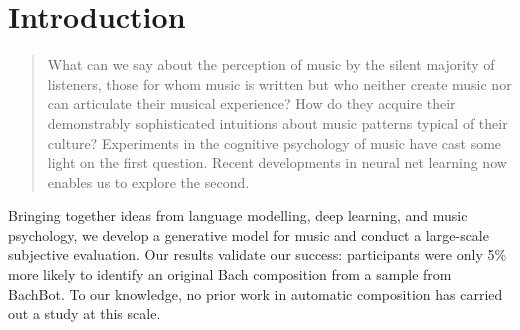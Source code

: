 


\chapter{Introduction}

\ifpdf
    \graphicspath{{Chapter1/Figs/Raster/}{Chapter1/Figs/PDF/}{Chapter1/Figs/}}
\else
    \graphicspath{{Chapter1/Figs/Vector/}{Chapter1/Figs/}}
\fi

\begin{quote}
  What can we say about the perception of music by the silent majority of
  listeners, those for whom music is written but who neither create music nor
  can articulate their musical experience? How do they acquire their
  demonstrably sophisticated intuitions about music patterns
  typical of their culture? Experiments in the cognitive psychology of music
  have cast some light on the first question. Recent developments in neural net learning
  now enables us to explore the second.
\end{quote} \citet{bharucha1989modeling}

Bringing together ideas from language modelling, deep learning, and music
psychology, we develop a generative model for music and conduct a large-scale
subjective evaluation. Our results validate our success: participants were only
5\% more likely to identify an original Bach composition from a sample from
BachBot. To our knowledge, no prior work in automatic composition has carried
out a study at this scale.

